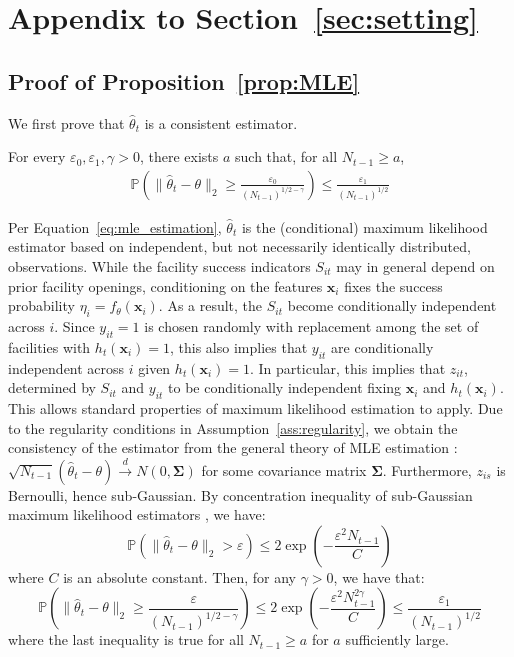 \documentclass[nonblindrev]{informs3noheader}
\def\P{\mathbb{P}}
\def\bx{\boldsymbol{x}}
\def\bSigma{\boldsymbol{\Sigma}}
\begin{document}
\section{Appendix to Section~\ref{sec:setting}}
\label{app:stats}

\subsection{Proof of Proposition~\ref{prop:MLE}}
We first prove that $\widehat{\theta}_t$ is a consistent estimator.
    \begin{lemma}\label{lem:mle}
    For every $\varepsilon_0, \varepsilon_1,\gamma>0$, there exists $a$ such that, for all $N_{t-1}\geq a$,
             \begin{align}
            \P\left(\|\widehat{\theta}_t-\theta\|_2\geq  \frac{\varepsilon_0}{(N_{t-1})^{1/2-\gamma}}\right)\leq\frac{\varepsilon_1}{(N_{t-1})^{1/2}} \label{eq:mle_bound}
        \end{align}
    \end{lemma} 
Per Equation~\eqref{eq:mle_estimation}, $\widehat{\theta}_t$ is the (conditional) maximum likelihood estimator based on independent, but not necessarily identically distributed, observations. While the facility success indicators $S_{it}$ may in general depend on prior facility openings, conditioning on the features $\bm{x}_i$ fixes the success probability $\eta_i = f_\theta(\bm{x}_i)$. As a result, the $S_{it}$ become conditionally independent across $i$. Since $y_{it}=1$ is chosen randomly with replacement among the set of facilities with $h_t(\bx_i)=1$, this also implies that $y_{it}$ are conditionally independent across $i$ given $h_t(\bx_i)=1$. In particular, this implies that $z_{it}$, determined by $S_{it}$ and $y_{it}$ to be conditionally independent fixing $\bx_i$ and $h_t(\bx_i)$. This allows standard properties of maximum likelihood estimation to apply. Due to the regularity conditions in Assumption~\ref{ass:regularity}, we obtain the consistency of the estimator from the general theory of MLE estimation \citep[e.g.,][]{hoadley1971asymptotic}:
        $\sqrt{N_{t-1}}\left(\widehat{\theta}_t -\theta\right)\xrightarrow{d} N(0,\bSigma)$ for some covariance matrix $\bSigma$. Furthermore, $z_{is}$ is Bernoulli, hence sub-Gaussian. By concentration inequality of sub-Gaussian maximum likelihood estimators \citep[see e.g.][]{yang2024concentration}, we have:
        \[\P(\|\widehat{\theta}_t-\theta\|_2>\varepsilon)\leq 2\exp\left(-\frac{\varepsilon^2N_{t-1}}{C}\right)\]
        where $C$ is an absolute constant. Then, for any $\gamma>0$, we have that:
        \begin{equation*}
   \P\left(\|\widehat{\theta}_t-\theta\|_2\geq  \frac{\varepsilon}{(N_{t-1})^{1/2-\gamma}}\right)\leq2\exp\left(-\frac{\varepsilon^2 N_{t-1}^{2\gamma}}{C}\right) \leq \frac{\varepsilon_1}{(N_{t-1})^{1/2}}
        \end{equation*}
        where the last inequality is true for all $N_{t-1}\geq a$ for $a$ sufficiently large.
    \hfill\Halmos
    
\end{document}
